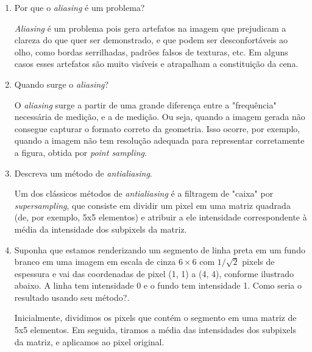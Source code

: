 \documentclass[12pt]{exam}
\begin{document}
\begin{enumerate}[label=\alph*)]
    \item Por que o \textit{aliasing} é um problema?
    
    \textit{Aliasing} é um problema pois gera artefatos na imagem que prejudicam a clareza do que quer ser demonstrado, e que podem ser desconfortáveis ao olho, como bordas serrilhadas, padrões falsos de texturas, etc. Em alguns casos esses artefatos são muito visíveis e atrapalham a constituição da cena.
    
    \item Quando surge o \textit{aliasing}?
    
    O \textit{aliasing} surge a partir de uma grande diferença entre a "frequência" necessária de medição, e a de medição. Ou seja, quando a imagem gerada não consegue capturar o formato correto da geometria. Isso ocorre, por exemplo, quando a imagem não tem resolução adequada para representar corretamente a figura, obtida por \textit{point sampling}.
    
    \item Descreva um método de \textit{antialiasing}.
    
    Um dos clássicos métodos de \textit{antialiasing} é a filtragem de "caixa" por \textit{supersampling}, que consiste em dividir um pixel em uma matriz quadrada (de, por exemplo, 5x5 elementos) e atribuir a ele intensidade correspondente à média da intensidade dos subpixels da matriz.
    
    \item Suponha que estamos renderizando um segmento de linha preta em um fundo branco em uma imagem em escala de cinza $6\times6$ com $1/\sqrt{2}$ pixels de espessura e vai das coordenadas de pixel (1, 1) a (4, 4), conforme ilustrado abaixo. A linha tem intensidade 0 e o fundo tem intensidade 1. Como seria o resultado usando seu método?.
    
    Inicialmente, dividimos os pixels que contém o segmento em uma matriz de 5x5 elementos. Em seguida, tiramos a média das intensidades dos subpixels da matriz, e aplicamos ao pixel original.
    

\end{enumerate}
\end{document}
